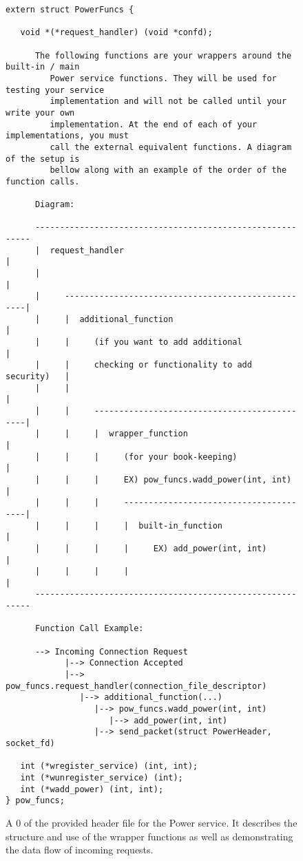 \documentclass[10pt]{article}
\begin{document}
\begin{figure}[here]
\small
\begin{verbatim}
extern struct PowerFuncs {     

   void *(*request_handler) (void *confd);

      The following functions are your wrappers around the built-in / main 
      	 Power service functions. They will be used for testing your service 
         implementation and will not be called until your write your own
         implementation. At the end of each of your implementations, you must
         call the external equivalent functions. A diagram of the setup is
         bellow along with an example of the order of the function calls.

      Diagram:

      ----------------------------------------------------------
      |  request_handler                                       |
      |                                                        |
      |     ---------------------------------------------------|
      |     |  additional_function                             |
      |     |     (if you want to add additional               |
      |     |     checking or functionality to add security)   |
      |     |                                                  |
      |     |     ---------------------------------------------|
      |     |     |  wrapper_function                          |
      |     |     |     (for your book-keeping)                |
      |     |     |     EX) pow_funcs.wadd_power(int, int)     |
      |     |     |     ---------------------------------------|
      |     |     |     |  built-in_function                   |
      |     |     |     |     EX) add_power(int, int)          |
      |     |     |     |                                      |
      ----------------------------------------------------------

      Function Call Example:
         
      --> Incoming Connection Request
            |--> Connection Accepted
            |--> pow_funcs.request_handler(connection_file_descriptor)
               |--> additional_function(...)
                  |--> pow_funcs.wadd_power(int, int)
                     |--> add_power(int, int)
                  |--> send_packet(struct PowerHeader, socket_fd)

   int (*wregister_service) (int, int);
   int (*wunregister_service) (int);
   int (*wadd_power) (int, int);
} pow_funcs;
\end{verbatim}
\caption{A 0 of the provided header file for the Power service. It
describes the structure and use of the wrapper functions as well as
demonstrating the data flow of incoming requests.}
\label{fig:wraperStructEx}
\end{figure}
\end{document}
